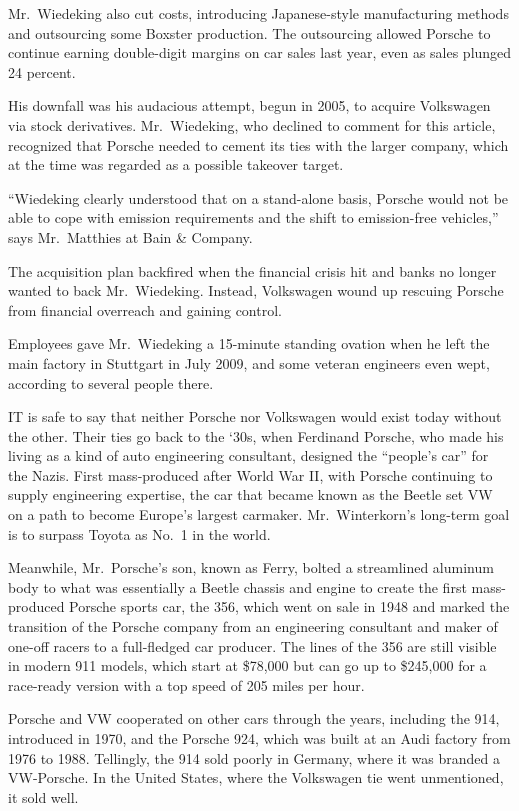 ﻿\documentclass[12pt]{article}
\begin{document}
Mr.~Wiedeking also cut costs, introducing Japanese-style manufacturing methods and outsourcing some
Boxster production. The outsourcing allowed Porsche to continue earning double-digit margins on car
sales last year, even as sales plunged 24 percent.

His downfall was his audacious attempt, begun in 2005, to acquire Volkswagen via stock derivatives.
Mr.~Wiedeking, who declined to comment for this article, recognized that Porsche needed to cement
its ties with the larger company, which at the time was regarded as a possible takeover target.

``Wiedeking clearly understood that on a stand-alone basis, Porsche would not be able to cope with
emission requirements and the shift to emission-free vehicles,'' says Mr.~Matthies at Bain \&
Company.

The acquisition plan backfired when the financial crisis hit and banks no longer wanted to back
Mr.~Wiedeking. Instead, Volkswagen wound up rescuing Porsche from financial overreach and gaining
control.

Employees gave Mr.~Wiedeking a 15-minute standing ovation when he left the main factory in Stuttgart
in July 2009, and some veteran engineers even wept, according to several people there.

IT is safe to say that neither Porsche nor Volkswagen would exist today without the other. Their
ties go back to the `30s, when Ferdinand Porsche, who made his living as a kind of auto engineering
consultant, designed the ``people's car'' for the Nazis. First mass-produced after World War II,
with Porsche continuing to supply engineering expertise, the car that became known as the Beetle set
VW on a path to become Europe's largest carmaker. Mr.~Winterkorn's long-term goal is to surpass
Toyota as No.~1 in the world.

Meanwhile, Mr.~Porsche's son, known as Ferry, bolted a streamlined aluminum body to what was
essentially a Beetle chassis and engine to create the first mass-produced Porsche sports car, the
356, which went on sale in 1948 and marked the transition of the Porsche company from an engineering
consultant and maker of one-off racers to a full-fledged car producer. The lines of the 356 are
still visible in modern 911 models, which start at \$78,000 but can go up to \$245,000 for a
race-ready version with a top speed of 205 miles per hour.

Porsche and VW cooperated on other cars through the years, including the 914, introduced in 1970,
and the Porsche 924, which was built at an Audi factory from 1976 to 1988. Tellingly, the 914 sold
poorly in Germany, where it was branded a VW-Porsche. In the United States, where the Volkswagen tie
went unmentioned, it sold well.
\end{document}
